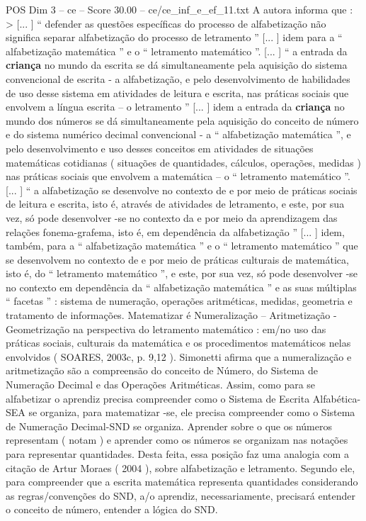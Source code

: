 \begin{textsample}{POS Dim 3 – ce – Score 30.00 – ce/ce\_inf\_e\_ef\_11.txt}
A autora informa que : > [... ] “ defender as questões específicas do processo de alfabetização não significa separar alfabetização do processo de letramento ” [... ] idem para a “ alfabetização matemática ” e o “ letramento matemático ”. [... ] “ a entrada da \textbf{criança} no mundo da escrita se dá simultaneamente pela aquisição do sistema convencional de escrita - a alfabetização, e pelo desenvolvimento de habilidades de uso desse sistema em atividades de leitura e escrita, nas práticas sociais que envolvem a língua escrita – o letramento ” [... ] idem a entrada da \textbf{criança} no mundo dos números se dá simultaneamente pela aquisição do conceito de número e do sistema numérico decimal convencional - a “ alfabetização matemática ”, e pelo desenvolvimento e uso desses conceitos em atividades de situações matemáticas cotidianas ( situações de quantidades, cálculos, operações, medidas ) nas práticas sociais que envolvem a matemática – o “ letramento matemático ”. [... ] “ a alfabetização se desenvolve no contexto de e por meio de práticas sociais de leitura e escrita, isto é, através de atividades de letramento, e este, por sua vez, só pode desenvolver -se no contexto da e por meio da aprendizagem das relações fonema-grafema, isto é, em dependência da alfabetização ” [... ] idem, também, para a “ alfabetização matemática ” e o “ letramento matemático ” que se desenvolvem no contexto de e por meio de práticas culturais de matemática, isto é, do “ letramento matemático ”, e este, por sua vez, só pode desenvolver -se no contexto em dependência da “ alfabetização matemática ” e as suas múltiplas “ facetas ” : sistema de numeração, operações aritméticas, medidas, geometria e tratamento de informações.
Matematizar é Numeralização – Aritmetização - Geometrização na perspectiva do letramento matemático : em/no uso das práticas sociais, culturais da matemática e os procedimentos matemáticos nelas envolvidos ( SOARES, 2003c, p. 9,12 ).
Simonetti afirma que a numeralização e aritmetização são a compreensão do conceito de Número, do Sistema de Numeração Decimal e das Operações Aritméticas.
Assim, como para se alfabetizar o aprendiz precisa compreender como o Sistema de Escrita Alfabética-SEA se organiza, para matematizar -se, ele precisa compreender como o Sistema de Numeração Decimal-SND se organiza.
Aprender sobre o que os números representam ( notam ) e aprender como os números se organizam nas notações para representar quantidades.
Desta feita, essa posição faz uma analogia com a citação de Artur Moraes ( 2004 ), sobre alfabetização e letramento.
Segundo ele, para compreender que a escrita matemática representa quantidades considerando as regras/convenções do SND, a/o aprendiz, necessariamente, precisará entender o conceito de número, entender a lógica do SND.

\end{textsample}
